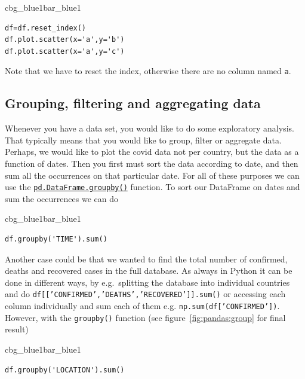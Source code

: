 \documentclass[%
oneside,                 %
final,                   %
10pt]{article}
\newenvironment{_pro_tight}[2]{
   \def\FrameCommand{\color{#2}\vrule width 1mm\normalcolor\colorbox{#1}}
   \FrameRule0.6pt\MakeFramed {\advance\hsize-2mm\FrameRestore}\vskip3mm}
   {\vskip0mm\endMakeFramed}
\newenvironment{pro}[2]{
\bgroup\rmfamily
\fboxsep=0mm\relax
\begin{_pro_tight}{#1}{#2}
\list{}{\parsep=-2mm\parskip=0mm\topsep=0pt\leftmargin=2mm
\rightmargin=2\leftmargin\leftmargin=4pt\relax}
\item\relax}
{\endlist\end{_pro_tight}\egroup}
\begin{document}
\begin{pro}{cbg_blue1}{bar_blue1}\begin{Verbatim}[numbers=none,fontsize=\fontsize{9pt}{9pt},baselinestretch=0.95,xleftmargin=2mm]
df=df.reset_index()
df.plot.scatter(x='a',y='b')
df.plot.scatter(x='a',y='c')

\end{Verbatim}
\end{pro}
\noindent

Note that we have to reset the index, otherwise there are no column named \texttt{a}. 

\subsection{Grouping, filtering and aggregating data}
Whenever you have a data set, you would like to do some exploratory analysis. That typically means that you would like to group, filter or aggregate data. Perhaps, we would like to plot the covid data not per country, but the data as a function of dates. Then you first must sort the data according to date, and then sum all the occurrences on that particular date. For all of these purposes we can use the \href{{https://pandas.pydata.org/docs/reference/api/pandas.DataFrame.groupby.html}}{\nolinkurl{pd.DataFrame.groupby()}} function. To sort our DataFrame on dates and sum the occurrences we can do


\begin{pro}{cbg_blue1}{bar_blue1}\begin{Verbatim}[numbers=none,fontsize=\fontsize{9pt}{9pt},baselinestretch=0.95,xleftmargin=2mm]
df.groupby('TIME').sum()

\end{Verbatim}
\end{pro}
\noindent


Another case could be that we wanted to find the total number of confirmed, deaths and recovered cases in the full database. As always in Python it can be done in different ways, by e.g.~splitting the database into individual countries and do  \texttt{df[['CONFIRMED','DEATHS','RECOVERED']].sum()} or accessing each column individually and sum each of them e.g. \texttt{np.sum(df['CONFIRMED'])}.  However, with the \texttt{groupby()} function
(see figure~\ref{fig:pandas:group} for final result)


\begin{pro}{cbg_blue1}{bar_blue1}\begin{Verbatim}[numbers=none,fontsize=\fontsize{9pt}{9pt},baselinestretch=0.95,xleftmargin=2mm]
df.groupby('LOCATION').sum()

\end{Verbatim}
\end{pro}
\noindent
\end{document}
